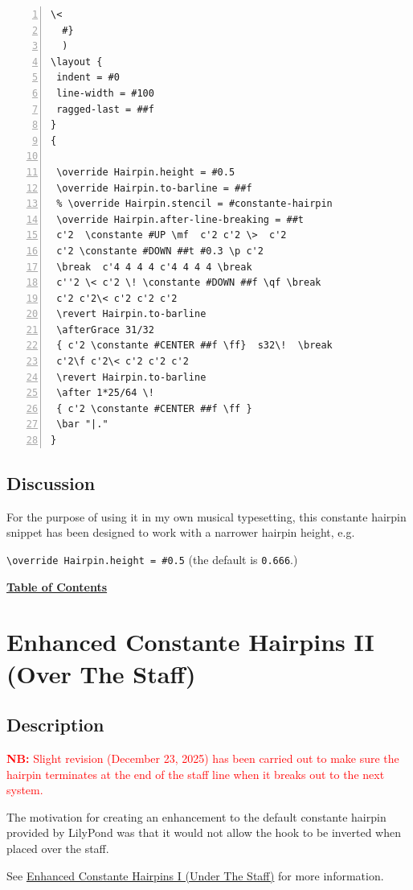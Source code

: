 \begin{Verbatim}[numbers=left,xleftmargin=5mm]
   \<
  #}
  )
\layout {
 indent = #0
 line-width = #100
 ragged-last = ##f
}
{

 \override Hairpin.height = #0.5
 \override Hairpin.to-barline = ##f
 % \override Hairpin.stencil = #constante-hairpin
 \override Hairpin.after-line-breaking = ##t
 c'2  \constante #UP \mf  c'2 c'2 \>  c'2
 c'2 \constante #DOWN ##t #0.3 \p c'2
 \break  c'4 4 4 4 c'4 4 4 4 \break
 c''2 \< c'2 \! \constante #DOWN ##f \qf \break
 c'2 c'2\< c'2 c'2 c'2
 \revert Hairpin.to-barline
 \afterGrace 31/32
 { c'2 \constante #CENTER ##f \ff}  s32\!  \break
 c'2\f c'2\< c'2 c'2 c'2
 \revert Hairpin.to-barline
 \after 1*25/64 \!
 { c'2 \constante #CENTER ##f \ff }
 \bar "|."
}

\end{Verbatim}
\subsection{Discussion}

For the purpose of using it in my own musical typesetting, this constante hairpin snippet has been designed to work with a narrower hairpin height, e.g.

\verb|\override Hairpin.height = #0.5| (the default is \verb|0.666|.)

\hyperref[sec:toc]{\textbf{Table of Contents}}
\vfill \break






\section {Enhanced Constante Hairpins II (Over The Staff)}
\label{sec:enhanced_constante_hairpins_2}
\hfill
{}
\hfill

\subsection{Description}

\textcolor{red}{\textbf{NB: } Slight revision (December 23, 2025) has been carried out to make sure the hairpin terminates at the end of the staff line when it breaks out to the next system. }

The motivation for creating an enhancement to the default constante hairpin provided by LilyPond was that it would not allow the hook to be inverted when placed over the staff. 

See \hyperref[sec:enhanced_constante_hairpins_1]{Enhanced Constante Hairpins I (Under The Staff)} for more information.

